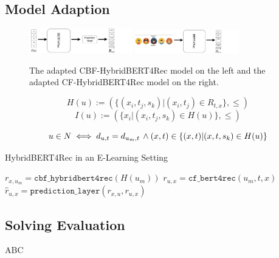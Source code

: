 \documentclass{Academic}
\begin{document}
    \subsection{Model Adaption}
    \begin{figure}[ht!]
        \centering
        \includegraphics[width=0.4\textwidth]{images/cbf.pdf}
        \includegraphics[width=0.4\textwidth]{images/CF_use_case.pdf}
        \caption{The adapted CBF-HybridBERT4Rec model on the left and the adapted CF-HybridBERT4Rec model on the right.}
        \label{fig:modelAdapt}
    \end{figure}

    \begin{equation}
        H(u) := (\{(x_i, t_j, s_k)| (x_i, t_j) \in R_{t,x}\}, \leq)
    \end{equation}
    \begin{equation}
        I(u) := (\{x_i|(x_i, t_j, s_k) \in H(u)\}, \leq)
    \end{equation}

    \begin{equation}
        u \in N \iff d_{u, t} = d_{u_m, t} \text{\,} \wedge (x, t) \in \{(x,t)|(x,t,s_k) \in H(u)\}
    \end{equation}

    \begin{algorithm}[ht!]
        \caption{HybridBERT4Rec in an E-Learning Setting}
        \begin{algorithmic}[1]
                \State $r_{x,u_m} = \texttt{cbf\_hybridbert4rec}(H(u_m))$
                    \State $r_{u, x} = \texttt{cf\_bert4rec}(u_m,t,x)$
                    \State $\hat{r}_{u,x} = \texttt{prediction\_layer}(r_{x,u}, r_{u,x})$
                \EndFor
            \EndFor
        \end{algorithmic}
    \end{algorithm}

    \FloatBarrier
    \subsection{Solving Evaluation}
    ABC
\end{document}
